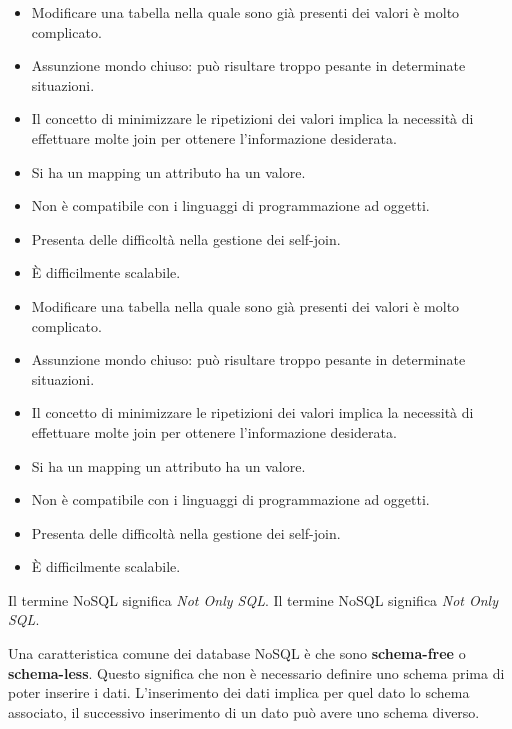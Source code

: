\begin{itemize}
      \item Modificare una tabella nella quale sono già presenti dei valori è molto
            complicato.
      \item Assunzione mondo chiuso: può risultare troppo pesante in determinate
            situazioni.
      \item Il concetto di minimizzare le ripetizioni dei valori implica la necessità
            di effettuare molte join per ottenere l'informazione desiderata.
      \item Si ha un mapping un attributo ha un valore.
      \item Non è compatibile con i linguaggi di programmazione ad oggetti.
      \item Presenta delle difficoltà nella gestione dei self-join.
      \item È difficilmente scalabile.
      \item Modificare una tabella nella quale sono già presenti dei valori è molto
            complicato.
      \item Assunzione mondo chiuso: può risultare troppo pesante in determinate
            situazioni.
      \item Il concetto di minimizzare le ripetizioni dei valori implica la necessità
            di effettuare molte join per ottenere l'informazione desiderata.
      \item Si ha un mapping un attributo ha un valore.
      \item Non è compatibile con i linguaggi di programmazione ad oggetti.
      \item Presenta delle difficoltà nella gestione dei self-join.
      \item È difficilmente scalabile.
\end{itemize}
\begin{nota}
      Il termine NoSQL significa \textit{Not Only SQL}.
      Il termine NoSQL significa \textit{Not Only SQL}.
\end{nota}
Una caratteristica comune dei database NoSQL è che sono \textbf{schema-free} o
\textbf{schema-less}. Questo significa che non è necessario definire uno schema
prima di poter inserire i dati. L'inserimento dei dati implica per quel dato lo
schema associato, il successivo inserimento di un dato può avere uno schema diverso.

